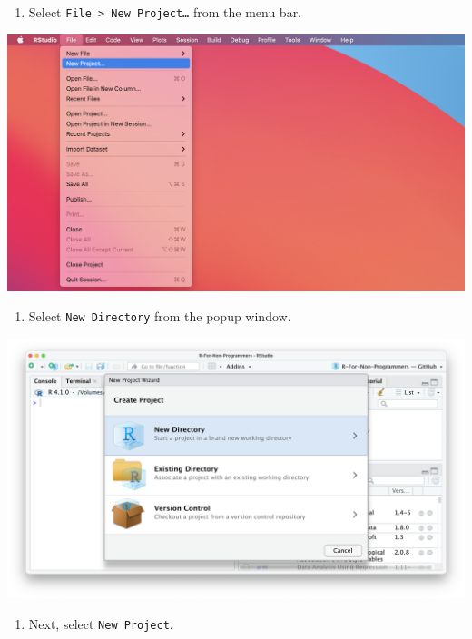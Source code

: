 \documentclass[
  letterpaper,
  DIV=11,
  numbers=noendperiod]{scrreprt}
\providecommand{\tightlist}{%
  \setlength{\itemsep}{0pt}\setlength{\parskip}{0pt}}\usepackage{longtable,booktabs,array}
\begin{document}
\begin{enumerate}
\def\labelenumi{\arabic{enumi}.}
\tightlist
\item
  Select \texttt{File\ \textgreater{}\ New\ Project…} from the menu bar.
\end{enumerate}

\includegraphics{images/chapter_06_img/00_r_project/00_r_project_file_menu.png}

\begin{enumerate}
\def\labelenumi{\arabic{enumi}.}
\setcounter{enumi}{1}
\tightlist
\item
  Select \texttt{New\ Directory} from the popup window.
\end{enumerate}

\includegraphics{images/chapter_06_img/00_r_project/01_r_project_new_directory.png}

\begin{enumerate}
\def\labelenumi{\arabic{enumi}.}
\setcounter{enumi}{2}
\tightlist
\item
  Next, select \texttt{New\ Project}.
\end{enumerate}
\end{document}
